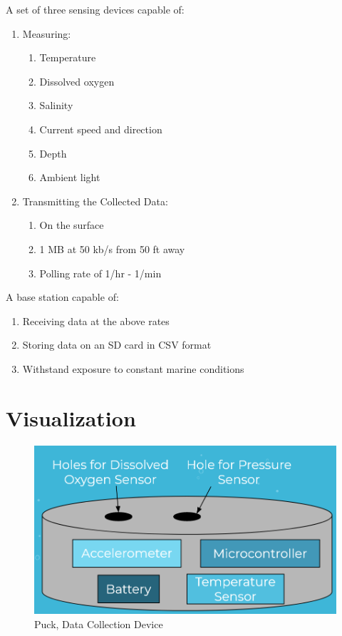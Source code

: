 \documentclass[12pt]{article}         %
\begin{document}
A set of three sensing devices capable of: 
\begin{enumerate}
    \item Measuring:
    \begin{enumerate}
        \item Temperature
        \item Dissolved oxygen
        \item Salinity
        \item Current speed and direction
        \item Depth
        \item Ambient light
    \end{enumerate}
    \item Transmitting the Collected Data:
    \begin{enumerate}
        \item On the surface
        \item 1 MB at 50 kb/s from 50 ft away
        \item Polling rate of 1/hr - 1/min
    \end{enumerate}
\end{enumerate}

A base station capable of: 
\begin{enumerate}
    \item Receiving data at the above rates
    \item Storing data on an SD card in CSV format
    \item Withstand exposure to constant marine conditions
\end{enumerate}

\section{Visualization}  %

\begin{figure}[h]
    \centering
    \includegraphics[scale=0.6]{puck}
    \caption{Puck, Data Collection Device}
    \label{fig:my_label}
\end{figure}
\end{document}

